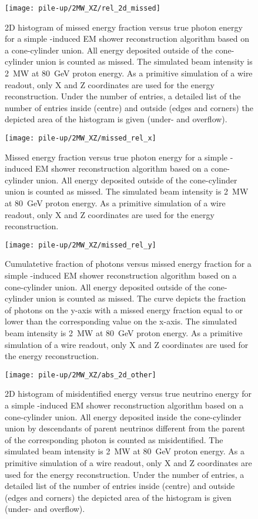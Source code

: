 \begin{figure}[htb]
	\centering
	\texttt{[image: pile-up/2MW\_XZ/rel\_2d\_missed]}
	\caption{2D histogram of missed energy fraction versus true photon energy for a simple \Pgpz-induced EM shower reconstruction algorithm based on a cone-cylinder union.
		All energy deposited outside of the cone-cylinder union is counted as missed.
		The simulated beam intensity is \SI{2}{\mega\watt} at \SI{80}{\giga\electronvolt} proton energy.
		As a primitive simulation of a wire readout, only X and Z coordinates are used for the energy reconstruction.
		Under the number of entries, a detailed list of the number of entries inside (centre) and outside (edges and corners) the depicted area of the histogram is given (under- and overflow).}
\end{figure}

\begin{figure}[htb]
	\centering
	\texttt{[image: pile-up/2MW\_XZ/missed\_rel\_x]}
	\caption{Missed energy fraction versus true photon energy for a simple \Pgpz-induced EM shower reconstruction algorithm based on a cone-cylinder union.
		All energy deposited outside of the cone-cylinder union is counted as missed.
		The simulated beam intensity is \SI{2}{\mega\watt} at \SI{80}{\giga\electronvolt} proton energy.
		As a primitive simulation of a wire readout, only X and Z coordinates are used for the energy reconstruction.}
\end{figure}

\begin{figure}[htb]
	\centering
	\texttt{[image: pile-up/2MW\_XZ/missed\_rel\_y]}
	\caption{Cumulatetive fraction of photons versus missed energy fraction for a simple \Pgpz-induced EM shower reconstruction algorithm based on a cone-cylinder union.
		All energy deposited outside of the cone-cylinder union is counted as missed.
		The curve depicts the fraction of photons on the y-axis with a missed energy fraction equal to or lower than the corresponding value on the x-axis.
		The simulated beam intensity is \SI{2}{\mega\watt} at \SI{80}{\giga\electronvolt} proton energy.
		As a primitive simulation of a wire readout, only X and Z coordinates are used for the energy reconstruction.}
\end{figure}

\begin{figure}[htb]
	\centering
	\texttt{[image: pile-up/2MW\_XZ/abs\_2d\_other]}
	\caption{2D histogram of misidentified energy versus true neutrino energy for a simple \Pgpz-induced EM shower reconstruction algorithm based on a cone-cylinder union.
		All energy deposited inside the cone-cylinder union by descendants of parent neutrinos different from the parent of the corresponding \Pgpz photon is counted as misidentified.
		The simulated beam intensity is \SI{2}{\mega\watt} at \SI{80}{\giga\electronvolt} proton energy.
		As a primitive simulation of a wire readout, only X and Z coordinates are used for the energy reconstruction.
		Under the number of entries, a detailed list of the number of entries inside (centre) and outside (edges and corners) the depicted area of the histogram is given (under- and overflow).}
\end{figure}

